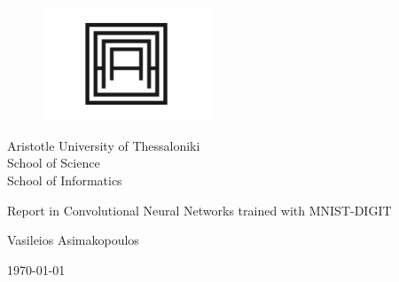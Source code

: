 \begin{titlepage}
	\afterpage{\blankpage}	
	\begin{figure}[H]
		\begin{center}
			\includegraphics[width=5cm]{Results/AUTH-01.jpg}
			\label{fig:cover_auth_logo}
		\end{center}
	\end{figure}
	
	\centering
	\Large Aristotle University of Thessaloniki \\
	\Large School of Science\\
	\large School of Informatics\\
	
	
	\vspace{\fill}
	
	\LARGE Report in Convolutional Neural Networks trained with MNIST-DIGIT
	
	\vspace{\fill}
	
	Vasileios Asimakopoulos
	
	
	
	\centering
	
	\today
	
\end{titlepage}

